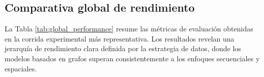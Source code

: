\documentclass[preprint,number]{elsarticle}
\begin{document}
\subsection{Comparativa global de rendimiento}

La Tabla \ref{tab:global_performance} resume las métricas de evaluación obtenidas en la corrida experimental más representativa. Los resultados revelan una jerarquía de rendimiento clara definida por la estrategia de datos, donde los modelos basados en grafos superan consistentemente a los enfoques secuenciales y espaciales.

\end{document}
